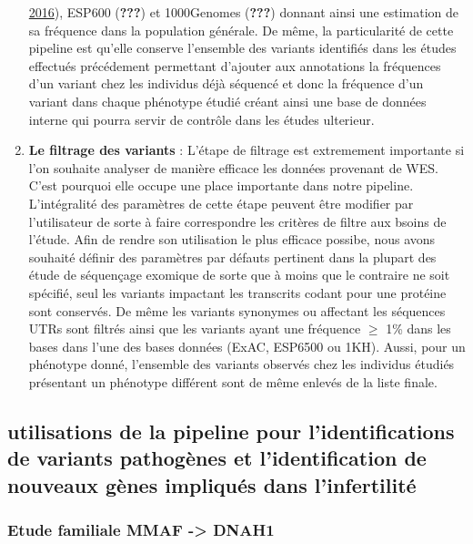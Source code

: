 \documentclass[12pt,twoside]{reedthesis}
\theoremstyle{definition}
\theoremstyle{definition}
\theoremstyle{remark}
\begin{document}
\begin{enumerate}
    \protect\hyperlink{ref-Lek2016}{2016}), ESP600 ({\textbf{???}}) et
    1000Genomes ({\textbf{???}}) donnant ainsi une estimation de sa
    fréquence dans la population générale. De même, la particularité de
    cette pipeline est qu'elle conserve l'ensemble des variants identifiés
    dans les études effectués précédement permettant d'ajouter aux
    annotations la fréquences d'un variant chez les individus déjà
    séquencé et donc la fréquence d'un variant dans chaque phénotype
    étudié créant ainsi une base de données interne qui pourra servir de
    contrôle dans les études ulterieur.
  \item
    \textbf{Le filtrage des variants} : L'étape de filtrage est
    extremement importante si l'on souhaite analyser de manière efficace
    les données provenant de WES. C'est pourquoi elle occupe une place
    importante dans notre pipeline. L'intégralité des paramètres de cette
    étape peuvent être modifier par l'utilisateur de sorte à faire
    correspondre les critères de filtre aux bsoins de l'étude. Afin de
    rendre son utilisation le plus efficace possibe, nous avons souhaité
    définir des paramètres par défauts pertinent dans la plupart des étude
    de séquençage exomique de sorte que à moins que le contraire ne soit
    spécifié, seul les variants impactant les transcrits codant pour une
    protéine sont conservés. De même les variants synonymes ou affectant
    les séquences UTRs sont filtrés ainsi que les variants ayant une
    fréquence \(\ge\) 1\% dans les bases dans l'une des bases données
    (ExAC, ESP6500 ou 1KH). Aussi, pour un phénotype donné, l'ensemble des
    variants observés chez les individus étudiés présentant un phénotype
    différent sont de même enlevés de la liste finale.
  \end{enumerate}
  
  \subsection{utilisations de la pipeline pour l'identifications de
  variants pathogènes et l'identification de nouveaux gènes impliqués dans
  l'infertilité}\label{utilisations-de-la-pipeline-pour-lidentifications-de-variants-pathogenes-et-lidentification-de-nouveaux-genes-impliques-dans-linfertilite}
  
  \newpage  
  
  \hypertarget{famdnah1}{\subsubsection{Etude familiale MMAF
  -\textgreater{} DNAH1}\label{famdnah1}}
  
\end{document}
